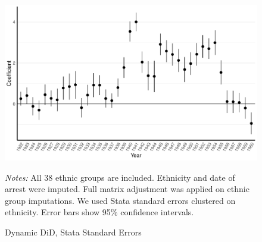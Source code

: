  \begin{figure}[H]
\centering
\caption{Dynamic DiD, Stata Standard Errors}
\includegraphics[width=\textwidth]{plots/final/fmla_pred_full_imp_date_no_trends_geopol_stata_SE.pdf}
\begin{minipage}{0.92\textwidth}
\footnotesize
\emph{Notes:} All 38 ethnic groups are included. Ethnicity and date of arrest were imputed.  Full matrix adjustment was applied on ethnic group imputations.  We used Stata standard errors clustered on ethnicity.  Error bars show 95\% confidence intervals. 
\end{minipage}
\label{fig:did_robustness_stata_se}
\end{figure}

%

